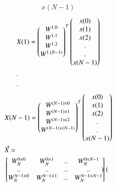 \documentclass[journal,12pt,twocolumn]{IEEEtran}
\renewcommand\thesection{\arabic{section}}
\begin{document}
\begin{enumerate}[label=\arabic*.,ref=\thesection.\theenumi]
\begin{align}
{                                                                x(N-1)
                                                               }
        \end{align}
        \begin{align}
       &X(1) = \begin{pmatrix}W^{1.0} \\ W^{1.1} \\ W^{1.2} \\ W^{1.(N-1)}\end{pmatrix}^T\begin{pmatrix}
                                                               x(0)\\
                                                                 x(1)\\
                                                                 x(2)\\
                                                                  .\\
                                                                  .\\
                                                                x(N-1)
                                                               \end{pmatrix}\\
             &.\nonumber \\
             &. \nonumber 
         \end{align}
         \begin{align}
       &X(N-1) = \begin{pmatrix}W^{(N-1)\times0} \\W^{(N-1)\times1}\\ W^{(N-1)\times2}\\  W^{(N-1)\times(N-1)}\end{pmatrix}^T\begin{pmatrix}
                                      x(0)\\
                                       x(1)\\
                                       x(2)\\
                                        .\\
                                        .\\
                                      x(N-1)
                                    \end{pmatrix}\\
      &\vec{X} = \nonumber\\ &\begin{bmatrix}
          W_N^{0\times0}&W_N^{0\times1}&..&W_N^{0\times N-1}\\
          ..&..&..&..\\
          W_N^{N-1 \times 0}&W_N^{N-1 \times 1}&..&W_N^{N-1 \times N-1}
        \end{bmatrix}\begin{pmatrix}
\end{pmatrix}
\end{align}
\end{enumerate}
\end{document}
